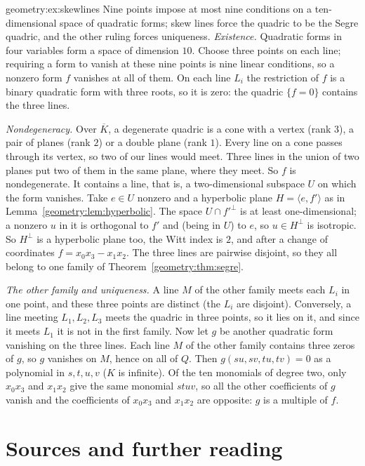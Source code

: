 \begin{solution}{geometry:ex:skewlines}
\idea Nine points impose at most nine conditions on a ten-dimensional space of quadratic forms; skew lines force the quadric to be the Segre quadric,
and the other ruling forces uniqueness.
\writeup \emph{Existence.} Quadratic forms in four variables form a space of dimension $10$. Choose three points on each line; requiring a form to vanish
at these nine points is nine linear conditions, so a nonzero form $f$ vanishes at all of them. On each line $L_i$ the restriction of $f$ is a binary
quadratic form with three roots, so it is zero: the quadric $\{f=0\}$ contains the three lines.

\emph{Nondegeneracy.} Over $\overline K$, a degenerate quadric is a cone with a vertex (rank $3$), a pair of planes (rank $2$) or a double plane (rank $1$).
Every line on a cone passes through its vertex, so two of our lines would meet. Three lines in the union of two planes put two of them in the same plane,
where they meet. So $f$ is nondegenerate. It contains a line, that is, a two-dimensional subspace $U$ on which the form vanishes. Take $e\in U$ nonzero and a
hyperbolic plane $H=\langle e,f'\rangle$ as in Lemma~\ref{geometry:lem:hyperbolic}. The space $U\cap f'^\perp$ is at least one-dimensional; a nonzero $u$ in it is
orthogonal to $f'$ and (being in $U$) to $e$, so $u\in H^\perp$ is isotropic. So $H^\perp$ is a hyperbolic plane too, the Witt index is $2$, and after a
change of coordinates $f=x_0x_3-x_1x_2$. The three lines are pairwise disjoint, so they all belong to one family of Theorem~\ref{geometry:thm:segre}.

\emph{The other family and uniqueness.} A line $M$ of the other family meets each $L_i$ in one point, and these three points are distinct (the $L_i$ are
disjoint). Conversely, a line meeting $L_1,L_2,L_3$ meets the quadric in three points, so it lies on it, and since it meets $L_1$ it is not in the first family.
Now let $g$ be another quadratic form vanishing on the three lines. Each line $M$ of the other family contains three zeros of $g$, so $g$ vanishes on $M$, hence
on all of $Q$. Then $g(su,sv,tu,tv)=0$ as a polynomial in $s,t,u,v$ ($K$ is infinite). Of the ten monomials of degree two, only $x_0x_3$ and $x_1x_2$ give the
same monomial $stuv$, so all the other coefficients of $g$ vanish and the coefficients of $x_0x_3$ and $x_1x_2$ are opposite: $g$ is a multiple of $f$.
\end{solution}

\section*{Sources and further reading}

